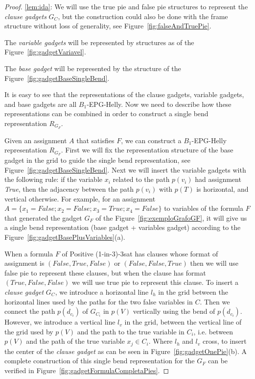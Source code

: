 \documentclass[runningheads]{llncs}
\begin{document}
\begin{proof}
\ref{lem:ida}:
We will use the true pie and false pie structures to represent the \textit{clause gadgets} $ G_C$, but the construction could also be done with the frame structure without loss of generality, see Figure~\ref{fig:falseAndTruePie}.  




The \textit{variable gadgets} will be represented by structures as of the Figure~\ref{fig:gadgetVariavel}.




The \textit{base gadget} will be represented by the structure of the Figure~\ref{fig:gadgetBaseSingleBend}.



It is easy to see that the representations of the clause gadgets, variable gadgets, and base gadgets are all $B_1$-EPG-Helly. Now we need to describe how these representations can be combined in order to construct a single bend representation $R_{G_F}$.

Given an assignment $A$ that satisfies $F$, we can construct a  $B_{1}$-EPG-Helly representation $R_{G_F}$. First we will fix the representation structure of the base gadget in the grid to guide the single bend representation, see Figure~\ref{fig:gadgetBaseSingleBend}. Next we will insert the variable gadgets with the following rule: if the  variable $x_i$ related to the path $p(v_i)$ had assignment \textit{True}, then the adjacency between the path $p(v_i)$ with $p(T)$ is horizontal, and vertical otherwise. For example, for an assignment $A=\{x_1=False; x_2=False;x_3=True; x_4=False\}$  to variables of the formula $F$ that generated the gadget $G_F$ of the Figure~\ref{fig:exemploGrafoGF}, it will give us a single bend representation (base gadget + variables gadget) according to the Figure~\ref{fig:gadgetBasePlusVariables}(a). 

 When a formula $F$ of {\sc Positive (1-in-3)-3sat} has clauses whose format of assignment is $(False, True, False)$ or $(False, False, True)$ then we will use false pie to represent these clauses, but when the clause has format $(True, False, False)$ we will use true pie to represent this clause. To insert a \textit{ clause gadget} $G_{C}$, we introduce a horizontal line $l_{h}$ in the grid between the horizontal lines used by the paths for the two false variables in $ C $. Then we connect the path $p(d_{c_i})$ of $G_{C_i}$ in $p(V)$ vertically using the bend of $p(d_{c_i})$. However, we introduce a vertical line $ l_{v}$ in the grid, between the vertical line of the grid used by $p(V)$ and the path to the true variable in $C_i$, i.e. between $p(V)$ and the path of the true variable $x_j \in C_i$. Where $l_{h}$ and $l_{v}$ cross, to insert the center of the  \textit{clause gadget} as can be seen in Figure~\ref{fig:gadgetOnePie}(b). A complete construction of this single bend representation for the $G_F$ can be verified in 
Figure~\ref{fig:gadgetFormulaCompletaPies}.%


\end{proof}
\end{document}
